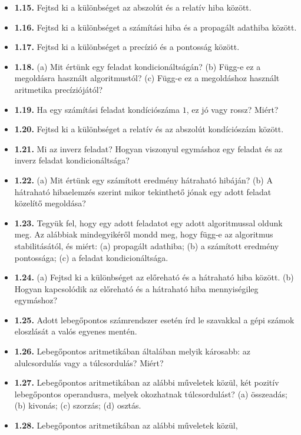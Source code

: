 \documentclass[
  magyar,
  11pt]{article}
\begin{document}
\begin{itemize}
  \textbf{1.14.} Fejtsd ki a különbséget a csonkítási (vagy
  diszkretizációs) hiba és a kerekítési hiba között.
\item
  \textbf{1.15.} Fejtsd ki a különbséget az abszolút és a relatív hiba
  között.
\item
  \textbf{1.16.} Fejtsd ki a különbséget a számítási hiba és a propagált
  adathiba között.
\item
  \textbf{1.17.} Fejtsd ki a különbséget a precízió és a pontosság
  között.
\item
  \textbf{1.18.} (a) Mit értünk egy feladat kondicionáltságán? (b)
  Függ-e ez a megoldásra használt algoritmustól? (c) Függ-e ez a
  megoldáshoz használt aritmetika precíziójától?
\item
  \textbf{1.19.} Ha egy számítási feladat kondíciószáma \(1\), ez jó
  vagy rossz? Miért?
\item
  \textbf{1.20.} Fejtsd ki a különbséget a relatív és az abszolút
  kondíciószám között.
\item
  \textbf{1.21.} Mi az inverz feladat? Hogyan viszonyul egymáshoz egy
  feladat és az inverz feladat kondicionáltsága?
\item
  \textbf{1.22.} (a) Mit értünk egy számított eredmény hátraható
  hibáján? (b) A hátraható hibaelemzés szerint mikor tekinthető jónak
  egy adott feladat közelítő megoldása?
\item
  \textbf{1.23.} Tegyük fel, hogy egy adott feladatot egy adott
  algoritmussal oldunk meg. Az alábbiak mindegyikéről mondd meg, hogy
  függ-e az algoritmus stabilitásától, és miért: (a) propagált adathiba;
  (b) a számított eredmény pontossága; (c) a feladat kondicionáltsága.
\item
  \textbf{1.24.} (a) Fejtsd ki a különbséget az előreható és a hátraható
  hiba között. (b) Hogyan kapcsolódik az előreható és a hátraható hiba
  mennyiségileg egymáshoz?
\item
  \textbf{1.25.} Adott lebegőpontos számrendszer esetén írd le szavakkal
  a gépi számok eloszlását a valós egyenes mentén.
\item
  \textbf{1.26.} Lebegőpontos aritmetikában általában melyik károsabb:
  az alulcsordulás vagy a túlcsordulás? Miért?
\item
  \textbf{1.27.} Lebegőpontos aritmetikában az alábbi műveletek közül,
  két pozitív lebegőpontos operandusra, melyek okozhatnak túlcsordulást?
  (a) összeadás; (b) kivonás; (c) szorzás; (d) osztás.
\item
  \textbf{1.28.} Lebegőpontos aritmetikában az alábbi műveletek közül,

\end{itemize}
\end{document}
